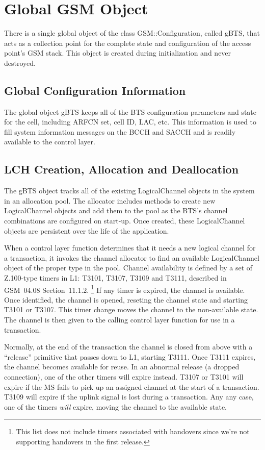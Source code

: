 \documentclass[11pt]{book}
\begin{document}
\section{Global GSM Object}
There is a single global object of the class GSM::Configuration, called gBTS, that acts as a collection point for the complete state and configuration of the access point's GSM stack. This object is created during initialization and never destroyed.

\subsection{Global Configuration Information}
The global object gBTS keeps all of the BTS configuration parameters and state for the cell, including ARFCN set, cell ID, LAC, etc. This information is used to fill system information messages on the BCCH and SACCH and is readily available to the control layer.

\subsection{LCH Creation, Allocation and Deallocation}
The gBTS object tracks all of the existing LogicalChannel objects in the system in an allocation pool. The allocator includes methods to create new LogicalChannel objects and add them to the pool as the BTS's channel combinations are configured on start-up.  Once created, these LogicalChannel objects are persistent over the life of the application.

When a control layer function determines that it needs a new logical channel for a transaction, it invokes the channel allocator to find an available LogicalChannel object of the proper type in the pool.  Channel availability is defined by a set of Z.100-type timers in L1: T3101, T3107, T3109 and T3111, described in GSM~04.08 Section~11.1.2.%
\footnote{This list does not include timers associated with handovers since we're not supporting handovers in the first release.}
If any timer is expired, the channel is available.
Once identified, the channel is opened, reseting the channel state and starting T3101 or T3107.  This timer change moves the channel to the non-available state.  The channel is then given to the calling control layer function for use in a transaction.

Normally, at the end of the transaction the channel is closed from above with a ``release'' primitive that passes down to L1, starting T3111.  Once T3111 expires, the channel becomes available for reuse.
In an abnormal release (a dropped connection), one of the other timers will expire instead. T3107 or T3101 will expire if the MS fails to pick up an assigned channel at the start of a transaction.  T3109 will expire if the uplink signal is lost during a transaction. Any any case, one of the timers \emph{will} expire, moving the channel to the available state.
\end{document}
